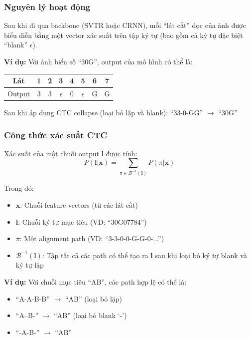 \subsubsection{Nguyên lý hoạt động}
Sau khi đi qua backbone (SVTR hoặc CRNN), mỗi ``lát cắt'' dọc của ảnh được biểu diễn bằng một vector xác suất trên tập ký tự (bao gồm cả ký tự đặc biệt ``blank'' $\epsilon$).

\textbf{Ví dụ:} Với ảnh biển số ``30G'', output của mô hình có thể là:
\begin{center}
\begin{tabular}{|c|c|c|c|c|c|c|c|}
\hline
Lát & 1 & 2 & 3 & 4 & 5 & 6 & 7 \\ \hline
Output & 3 & 3 & $\epsilon$ & 0 & $\epsilon$ & G & G \\ \hline
\end{tabular}
\end{center}

Sau khi áp dụng CTC collapse (loại bỏ lặp và blank): ``33-0-GG'' $\rightarrow$ ``30G''

\subsubsection{Công thức xác suất CTC}
Xác suất của một chuỗi output $\mathbf{l}$ được tính:
\begin{equation}
    P(\mathbf{l} | \mathbf{x}) = \sum_{\pi \in \mathcal{B}^{-1}(\mathbf{l})} P(\pi | \mathbf{x})
\end{equation}

Trong đó:
\begin{itemize}
    \item $\mathbf{x}$: Chuỗi feature vectors (từ các lát cắt)
    \item $\mathbf{l}$: Chuỗi ký tự mục tiêu (VD: ``30G07784'')
    \item $\pi$: Một alignment path (VD: ``3-3-0-0-G-G-0-...'')
    \item $\mathcal{B}^{-1}(\mathbf{l})$: Tập tất cả các path có thể tạo ra $\mathbf{l}$ sau khi loại bỏ ký tự blank và ký tự lặp
\end{itemize}

\textbf{Ví dụ:} Với chuỗi mục tiêu ``AB'', các path hợp lệ có thể là:
\begin{itemize}
    \item ``A-A-B-B'' $\rightarrow$ ``AB'' (loại bỏ lặp)
    \item ``A--B-'' $\rightarrow$ ``AB'' (loại bỏ blank `-')
    \item ``-A-B-'' $\rightarrow$ ``AB''
\end{itemize}

